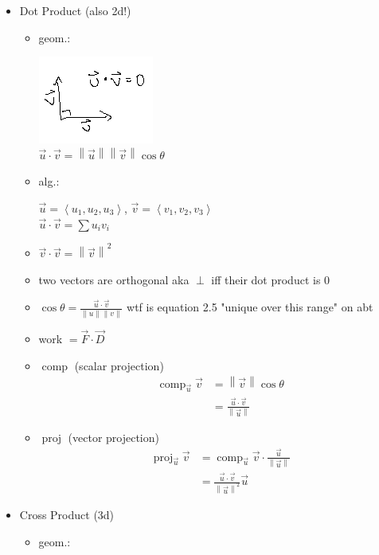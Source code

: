\documentclass[11pt]{article}
\theoremstyle{definition}
\newcommand{\col}[1]{\begin{minipage}{\columnwidth}#1\end{minipage}}
\newcommand{\magn}[1]{\left\lVert #1 \right\rVert}
\DeclareMathOperator{\proj}{proj}
\DeclareMathOperator{\comp}{comp}
\begin{document}
\begin{multicols}{2}
  \col{
    \begin{itemize}
      \item Dot Product (also 2d!)
      \begin{itemize}
        \item geom.:
        
        \includegraphics{dot_prod.png} \\
        $\vec{u} \cdot \vec{v} = \magn{\vec{u}} \magn{\vec{v}}\cos \theta$
        \item alg.:
        
        $\vec{u} = \left< u_1, u_2, u_3 \right>$, 
        $\vec{v} = \left< v_1, v_2, v_3 \right>$\\
        $\vec{u} \cdot \vec{v} = \sum u_i v_i$
        \item $\vec{v}\cdot\vec{v} = \magn{\vec{v}}^2$
        \item two vectors are orthogonal aka $\perp$ iff their dot product is $0$
        \item $\displaystyle\cos \theta = \frac{\vec{u} \cdot \vec{v}}{\magn{u}\magn{v}}$ wtf is equation 2.5 "unique over this range" on abt
        \item work $= \vec{F} \cdot \vec{D}$
        \item $\comp$ (scalar projection)
        \begin{align*}
          \comp_{\vec{u}} \vec{v} & = \magn{\vec{v}} \cos \theta \\
          & = \frac{\vec{u} \cdot \vec{v}}{\magn{\vec{u}}}
        \end{align*}
        \item $\proj$ (vector projection)
        \begin{align*}
          \proj_{\vec{u}} \vec{v} &= \comp_{\vec{u}} \vec{v} \cdot \frac{\vec{u}}{\magn{\vec{u}}} \\
          &= \frac{\vec{u}\cdot\vec{v}}{\magn{\vec{u}}^2}\vec{u}
        \end{align*}
      \end{itemize}
    \end{itemize}
  }
  \col{
    \begin{itemize}
      \item Cross Product (3d)
      \begin{itemize}
        \item geom.:
        

\end{itemize}
\end{itemize}}
\end{multicols}
\end{document}
